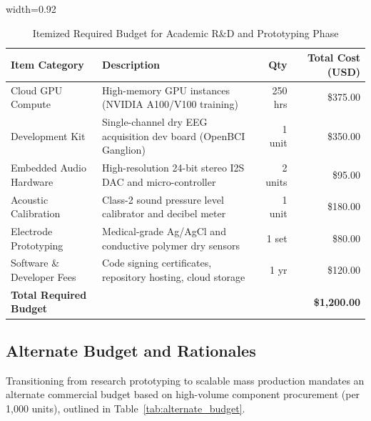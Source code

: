 \documentclass[12pt, a4paper]{report}
\begin{document}
\begin{table}[htbp]
\centering
\caption{Itemized Required Budget for Academic R\&D and Prototyping Phase}
\label{tab:required_budget}
\begin{adjustbox}{width=0.92\textwidth}
\begin{tabular}{llrr}
\toprule
\textbf{Item Category} & \textbf{Description} & \textbf{Qty} & \textbf{Total Cost (USD)} \\
\midrule
Cloud GPU Compute & High-memory GPU instances (NVIDIA A100/V100 training) & 250 hrs & \$375.00 \\
Development Kit & Single-channel dry EEG acquisition dev board (OpenBCI Ganglion) & 1 unit & \$350.00 \\
Embedded Audio Hardware & High-resolution 24-bit stereo I2S DAC and micro-controller & 2 units & \$95.00 \\
Acoustic Calibration & Class-2 sound pressure level calibrator and decibel meter & 1 unit & \$180.00 \\
Electrode Prototyping & Medical-grade Ag/AgCl and conductive polymer dry sensors & 1 set & \$80.00 \\
Software \& Developer Fees & Code signing certificates, repository hosting, cloud storage & 1 yr & \$120.00 \\
\midrule
\textbf{Total Required Budget} & & & \textbf{\$1,200.00} \\
\bottomrule
\end{tabular}
\end{adjustbox}
\end{table}

\subsection{Alternate Budget and Rationales}
Transitioning from research prototyping to scalable mass production mandates an alternate commercial budget based on high-volume component procurement (per 1,000 units), outlined in Table~\ref{tab:alternate_budget}.
\end{document}

